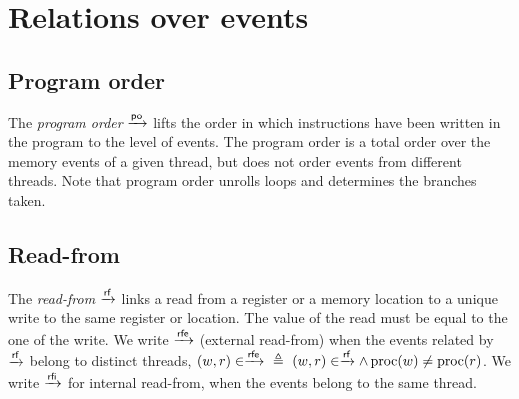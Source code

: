 \section{Relations over events} 

\subsection{Program order} 
The \emph{program order} $\xrightarrow{\textsf{\scriptsize{}po}}$ lifts the order in which instructions have been
written in the program to the level of events. The program order is a total
order over the memory events of a given thread, but does not order events from
different threads. Note that program order unrolls loops and determines the
branches taken. 

\subsection{Read-from}
The \emph{read-from} $\xrightarrow{\textsf{\scriptsize{}rf}}$ links a read from a register or a memory location to
a unique write to the same register or location. The value of the read must be
equal to the one of the write. We write $\xrightarrow{\textsf{\scriptsize{}rfe}}$ (external read-from) when the
events related by $\xrightarrow{\textsf{\scriptsize{}rf}}$ belong to distinct threads, \ie ${(w,r) \in
\xrightarrow{\textsf{\scriptsize{}rfe}}}~\triangleq~{(w,r) \in \xrightarrow{\textsf{\scriptsize{}rf}} \wedge \operatorname{proc}(w) \neq \operatorname{proc}(r)}$. We write $\xrightarrow{\textsf{\scriptsize{}rfi}}$ for internal
read-from, when the events belong to the same thread.



